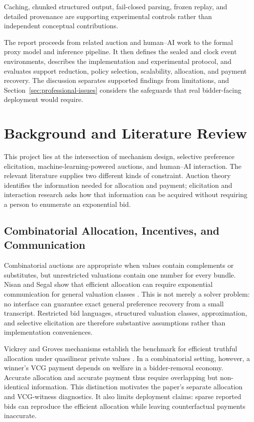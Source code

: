 Caching, chunked structured output, fail-closed parsing, frozen replay, and
detailed provenance are supporting experimental controls rather than
independent conceptual contributions.

The report proceeds from related auction and human--AI work to the formal
proxy model and inference pipeline. It then defines the sealed and clock event
environments, describes the implementation and experimental protocol, and
evaluates support reduction, policy selection, scalability, allocation, and
payment recovery. The discussion separates supported findings from
limitations, and Section~\ref{sec:professional-issues} considers the safeguards
that real bidder-facing deployment would require.

\section{Background and Literature Review}

This project lies at the intersection of mechanism design, selective
preference elicitation, machine-learning-powered auctions, and human--AI
interaction. The relevant literature supplies two different kinds of
constraint. Auction theory identifies the information needed for allocation
and payment; elicitation and interaction research asks how that information
can be acquired without requiring a person to enumerate an exponential bid.

\subsection{Combinatorial Allocation, Incentives, and Communication}

Combinatorial auctions are appropriate when values contain complements or
substitutes, but unrestricted valuations contain one number for every bundle.
Nisan and Segal show that efficient allocation can require exponential
communication for general valuation classes \citep{nisan2006communication}.
This is not merely a solver problem: no interface can guarantee exact general
preference recovery from a small transcript. Restricted bid languages,
structured valuation classes, approximation, and selective elicitation are
therefore substantive assumptions rather than implementation conveniences.

Vickrey and Groves mechanisms establish the benchmark for efficient truthful
allocation under quasilinear private values \citep{vickrey1961counterspeculation,groves1973incentives}.
In a combinatorial setting, however, a winner's VCG payment depends on welfare
in a bidder-removal economy. Accurate allocation and accurate payment thus
require overlapping but non-identical information. This distinction motivates
the paper's separate allocation and VCG-witness diagnostics. It also limits
deployment claims: sparse reported bids can reproduce the efficient allocation
while leaving counterfactual payments inaccurate.

